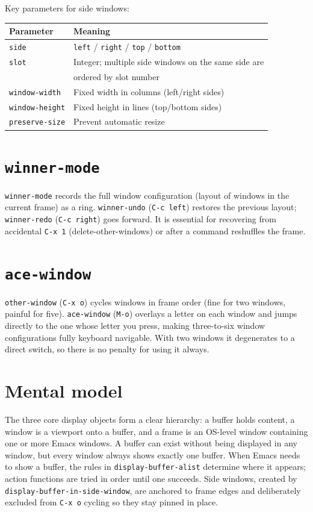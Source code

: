 Key parameters for side windows:

\begin{longtable}[]{@{}ll@{}}
\toprule
Parameter & Meaning \\
\midrule
\texttt{side} & \texttt{left} / \texttt{right} / \texttt{top} / \texttt{bottom} \\
\texttt{slot} & Integer; multiple side windows on the same side are \\
& ordered by slot number \\
\texttt{window-width} & Fixed width in columns (left/right sides) \\
\texttt{window-height} & Fixed height in lines (top/bottom sides) \\
\texttt{preserve-size} & Prevent automatic resize \\
\bottomrule
\end{longtable}

\section{\texttt{winner-mode}}\label{winner-mode}

\texttt{winner-mode} records the full window configuration (layout of windows in the current frame) as a ring. \texttt{winner-undo} (\texttt{C-c left}) restores the previous layout; \texttt{winner-redo} (\texttt{C-c right}) goes forward. It is essential for recovering from accidental \texttt{C-x 1} (delete-other-windows) or after a command reshuffles the frame.

\section{\texttt{ace-window}}\label{ace-window}

\texttt{other-window} (\texttt{C-x o}) cycles windows in frame order (fine for two windows, painful for five). \texttt{ace-window} (\texttt{M-o}) overlays a letter on each window and jumps directly to the one whose letter you press, making three-to-six window configurations fully keyboard navigable. With two windows it degenerates to a direct switch, so there is no penalty for using it always.

\section{Mental model}
The three core display objects form a clear hierarchy: a buffer holds content, a window is a viewport onto a buffer, and a frame is an OS-level window containing one or more Emacs windows.  A buffer can exist without being displayed in any window, but every window always shows exactly one buffer.  When Emacs needs to show a buffer, the rules in \texttt{display-buffer-alist} determine where it appears; action functions are tried in order until one succeeds.  Side windows, created by \texttt{display-buffer-in-side-window}, are anchored to frame edges and deliberately excluded from \texttt{C-x o} cycling so they stay pinned in place.

